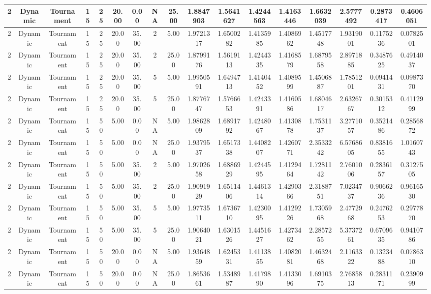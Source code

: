 \begin{longtable}{ | c | c | c | c | c | c | c | c | c | c | c | c | c | c | c | c | c | }
	\hline
	2	&	Dynamic	&	Tournament	&	15	&	25	&	20.00	&	0.00	&	NA	&	25.00	&	1.8847903	&	1.5641627	&	1.4244563	&	1.4163446	&	1.6632039	&	2.5777492	&	0.2873417	&	0.4606051 \\
	\hline
	2	&	Dynamic	&	Tournament	&	15	&	25	&	20.00	&	35.00	&	2	&	5.00	&	1.9721317	&	1.6500282	&	1.4135985	&	1.4086962	&	1.4517748	&	1.9319001	&	0.1175236	&	0.0782501 \\
	\hline
	2	&	Dynamic	&	Tournament	&	15	&	25	&	20.00	&	35.00	&	2	&	25.00	&	1.8799176	&	1.5619113	&	1.4244335	&	1.4168579	&	1.6879558	&	2.8971885	&	0.3487625	&	0.4914037 \\
	\hline
	2	&	Dynamic	&	Tournament	&	15	&	25	&	20.00	&	35.00	&	5	&	5.00	&	1.9950591	&	1.6494713	&	1.4140452	&	1.4089599	&	1.4506887	&	1.7851201	&	0.0941431	&	0.0987370 \\
	\hline
	2	&	Dynamic	&	Tournament	&	15	&	25	&	20.00	&	35.00	&	5	&	25.00	&	1.8776747	&	1.5766653	&	1.4243391	&	1.4160586	&	1.6804617	&	2.6326767	&	0.3015312	&	0.4112999 \\
	\hline
	2	&	Dynamic	&	Tournament	&	15	&	50	&	5.00	&	0.00	&	NA	&	5.00	&	1.9862809	&	1.6891792	&	1.4248067	&	1.4130878	&	1.7531137	&	3.2771057	&	0.3521486	&	0.2856872 \\
	\hline
	2	&	Dynamic	&	Tournament	&	15	&	50	&	5.00	&	0.00	&	NA	&	25.00	&	1.9379537	&	1.6517338	&	1.4408207	&	1.4260771	&	2.3533242	&	6.5768605	&	0.8381655	&	1.0160743 \\
	\hline
	2	&	Dynamic	&	Tournament	&	15	&	50	&	5.00	&	35.00	&	2	&	5.00	&	1.9702658	&	1.6886929	&	1.4244595	&	1.4129464	&	1.7281142	&	2.7601006	&	0.2836157	&	0.3127505 \\
	\hline
	2	&	Dynamic	&	Tournament	&	15	&	50	&	5.00	&	35.00	&	2	&	25.00	&	1.9091929	&	1.6511406	&	1.4461314	&	1.4290366	&	2.3188751	&	7.0234737	&	0.9066236	&	0.9616530 \\
	\hline
	2	&	Dynamic	&	Tournament	&	15	&	50	&	5.00	&	35.00	&	5	&	5.00	&	1.9773511	&	1.6736710	&	1.4230095	&	1.4129226	&	1.7305968	&	2.4772968	&	0.2476253	&	0.2977870 \\
	\hline
	2	&	Dynamic	&	Tournament	&	15	&	50	&	5.00	&	35.00	&	5	&	25.00	&	1.9064021	&	1.6301526	&	1.4451627	&	1.4273462	&	2.2857255	&	5.3737261	&	0.6709635	&	0.9410786 \\
	\hline
	2	&	Dynamic	&	Tournament	&	15	&	50	&	20.00	&	0.00	&	NA	&	5.00	&	1.9364859	&	1.6245331	&	1.4113855	&	1.4082081	&	1.4632468	&	2.1163322	&	0.1323488	&	0.0786310 \\
	\hline
	2	&	Dynamic	&	Tournament	&	15	&	50	&	20.00	&	0.00	&	NA	&	25.00	&	1.8653661	&	1.5348987	&	1.4179890	&	1.4133096	&	1.6910375	&	2.7685813	&	0.2831171	&	0.2390999 \\

\end{longtable}
